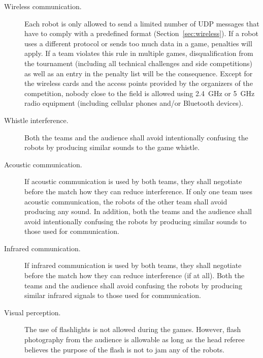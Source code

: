 \begin{description}

  \item[Wireless communication.] Each robot is only allowed to send a limited number of UDP messages that have to comply with a predefined format (\cf Section~\ref{sec:wireless}). If a robot uses a different protocol or sends too much data in a game, penalties will apply. If a team violates this rule in multiple games, disqualification from the tournament (including all technical challenges and side competitions) as well as an entry in the penalty list will be the consequence. Except for the wireless cards and the access points provided by the organizers of the competition, nobody close to the field is allowed using \qty{2.4}{\giga\hertz} or \qty{5}{\giga\hertz} radio equipment (including cellular phones and/or Bluetooth devices).

  \item[Whistle interference.] Both the teams and the audience shall avoid intentionally confusing the robots by producing similar sounds to the game whistle.

  \item[Acoustic communication.] If acoustic communication is used by both teams, they shall negotiate before the match how they can reduce interference. If only one team uses acoustic communication, the robots of the other team shall avoid producing any sound. In addition, both the teams and the audience shall avoid intentionally confusing the robots by producing similar sounds to those used for communication.

  \item[Infrared communication.] If infrared communication is used by both teams, they shall negotiate before the match how they can reduce interference (if at all). Both the teams and the audience shall avoid confusing the robots by producing similar infrared signals to those used for communication.

  \item[Visual perception.] The use of flashlights is not allowed during the games.  However, flash photography from the audience is allowable as long as the head referee believes the purpose of the flash is not to jam any of the robots.

\end{description}
